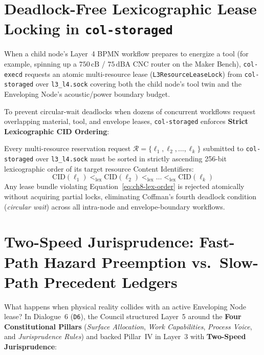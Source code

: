 \section{Deadlock-Free Lexicographic Lease Locking in \texttt{col-storaged}}
\label{sec:ch8-lexicographic-locks}

When a child node's Layer~4 BPMN workflow prepares to energize a tool (for example, spinning up a $750\,\mathrm{cB}$ / $75\,\mathrm{dBA}$ CNC router on the Maker Bench), \texttt{col-execd} requests an atomic multi-resource lease (\texttt{L3ResourceLeaseLock}) from \texttt{col-storaged} over \texttt{l3\_l4.sock} covering both the child node's tool twin and the Enveloping Node's acoustic/power boundary budget.

To prevent circular-wait deadlocks \parencite{coffman1971deadlocks} when dozens of concurrent workflows request overlapping material, tool, and envelope leases, \texttt{col-storaged} enforces \textbf{Strict Lexicographic CID Ordering}:
\begin{invariant}
\label{inv:ch8-lexicographic-leases}
Every multi-resource reservation request $\mathcal{R} = \{ \ell_1, \ell_2, \dots, \ell_k \}$ submitted to \texttt{col-storaged} over \texttt{l3\_l4.sock} must be sorted in strictly ascending 256-bit lexicographic order of its target resource Content Identifiers:
\begin{equation}
\mathrm{CID}(\ell_1) <_{\mathrm{lex}} \mathrm{CID}(\ell_2) <_{\mathrm{lex}} \dots <_{\mathrm{lex}} \mathrm{CID}(\ell_k)
\label{eq:ch8-lex-order}
\end{equation}
Any lease bundle violating Equation~\eqref{eq:ch8-lex-order} is rejected atomically without acquiring partial locks, eliminating Coffman's fourth deadlock condition (\textit{circular wait}) across all intra-node and envelope-boundary workflows.
\end{invariant}

\section{Two-Speed Jurisprudence: Fast-Path Hazard Preemption vs.\ Slow-Path Precedent Ledgers}
\label{sec:ch8-two-speed-jurisprudence}

What happens when physical reality collides with an active Enveloping Node lease? In Dialogue~6 (\texttt{D6}), the Council structured Layer~5 around the \textbf{Four Constitutional Pillars} (\textit{Surface Allocation}, \textit{Work Capabilities}, \textit{Process Voice}, and \textit{Jurisprudence Rules}) and backed Pillar~IV in Layer~3 with \textbf{Two-Speed Jurisprudence}:

